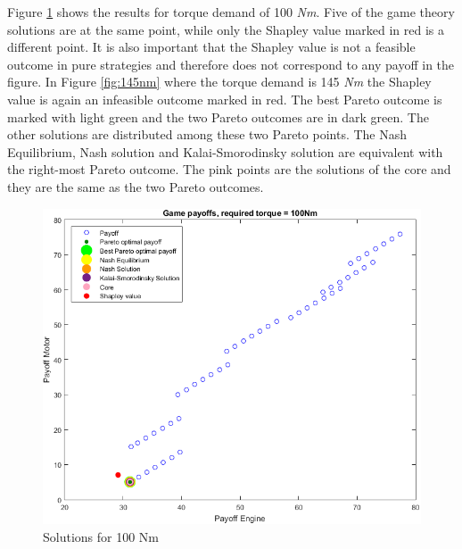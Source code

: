 Figure \ref{fig:100nm} shows the results for torque demand of 100 \textit{Nm}. Five of the game theory solutions are at the same point, while only the Shapley value marked in red is a different point. It is also important that the Shapley value is not a feasible outcome in pure strategies and therefore does not correspond to any payoff in the figure. In Figure \ref{fig:145nm} where the torque demand is 145 \textit{Nm} the Shapley value is again an infeasible outcome marked in red. The best Pareto outcome is marked with light green and the two Pareto outcomes are in dark green. The other solutions are distributed among these two Pareto points. The Nash Equilibrium, Nash solution and Kalai-Smorodinsky solution are equivalent with the right-most Pareto outcome. The pink points are the solutions of the core and they are the same as the two Pareto outcomes.


\begin{figure}[h]
	\centering
	\includegraphics[scale=0.55]{figures/gametheory/100nm}
	\caption{Solutions for 100 Nm}
	\label{fig:100nm}
\end{figure}


